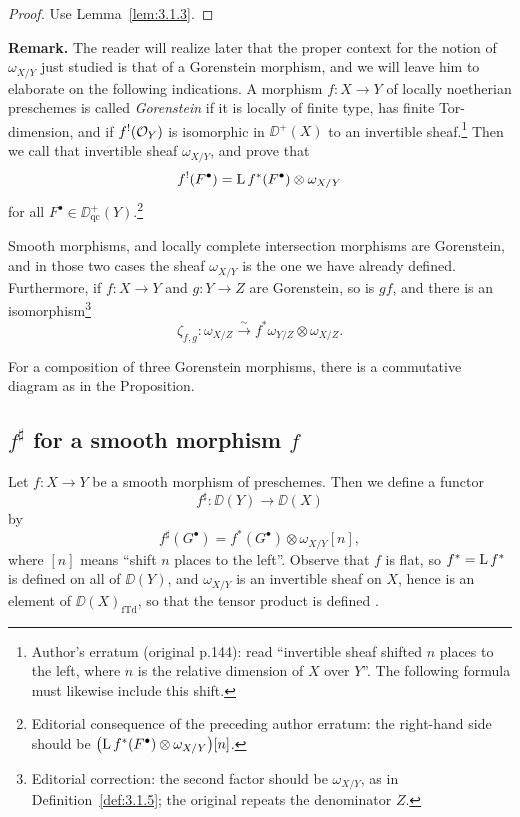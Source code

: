 \begin{proof}
Use Lemma~\ref{lem:3.1.3}.
\end{proof}

\textbf{Remark.}
The reader will realize later that the proper context for the notion of $\omega_{X/Y}$ just studied is that of a Gorenstein morphism, and we will leave him to elaborate on the following indications. A morphism $f\colon X\to Y$ of locally noetherian preschemes is called \emph{Gorenstein} if it is locally of finite type, has finite Tor-dimension, and if $f^!(\mathcal{O}_Y)$ is isomorphic in $\DD^+(X)$ to an invertible sheaf.\footnote{Author's erratum (original p.144): read ``invertible sheaf shifted $n$ places to the left, where $n$ is the relative dimension of $X$ over $Y$''. The following formula must likewise include this shift.} Then we call that invertible sheaf $\omega_{X/Y}$, and prove that
\[
f^!(F^\bullet) = \operatorname{L} f^*(F^\bullet)\otimes\omega_{X/Y}
\]
for all $F^\bullet\in\DD_{\mathrm{qc}}^+(Y)$.\footnote{Editorial consequence of the preceding author erratum: the right-hand side should be $\bigl(\operatorname{L} f^*(F^\bullet)\otimes\omega_{X/Y}\bigr)[n]$.}

Smooth morphisms, and locally complete intersection morphisms are Gorenstein, and in those two cases the sheaf $\omega_{X/Y}$ is the one we have already defined. Furthermore, if $f\colon X\to Y$ and $g\colon Y\to Z$ are Gorenstein, so is $gf$, and there is an isomorphism\footnote{Editorial correction: the second factor should be $\omega_{X/Y}$, as in Definition~\ref{def:3.1.5}; the original repeats the denominator $Z$.}
\[
\zeta_{f,g}\colon \omega_{X/Z} \xrightarrow{\sim} f^*\omega_{Y/Z}\otimes\omega_{X/Z}.
\]

For a composition of three Gorenstein morphisms, there is a commutative diagram as in the Proposition.

\begin{samepage}
\section{\texorpdfstring{$f^\sharp$}{f sharp} for a smooth morphism \texorpdfstring{$f$}{f}}\label{sec:3.2}

\begin{definition*}
Let $f\colon X\to Y$ be a smooth morphism of preschemes. Then we define a functor
\[
f^{\sharp}\colon \DD(Y) \longrightarrow \DD(X)
\]
by
\[
f^{\sharp}(G^\bullet) = f^*(G^\bullet)\otimes\omega_{X/Y}[n],
\]
where $[n]$ means ``shift $n$ places to the left''. Observe that $f$ is flat, so $f^*=\operatorname{L} f^*$ is defined on all of $\DD(Y)$, and $\omega_{X/Y}$ is an invertible sheaf on $X$, hence is an element of $\DD(X)_{\mathrm{fTd}}$, so that the tensor product is defined .
\end{definition*}
\end{samepage}

